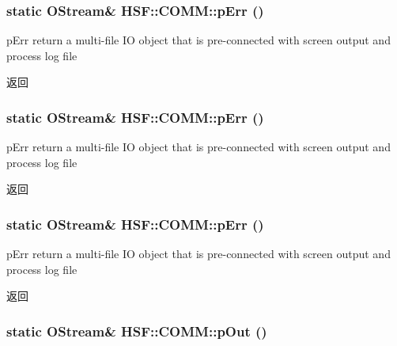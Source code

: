 \label{classHSF_1_1COMM_ad97b577f23c1a1f9f72d8d84b497e2c2}
\hypertarget{classHSF_1_1COMM_ad3b168a9b2f1a465334f5c161d8fb67b}{
\subsubsection[{pErr}]{\setlength{\rightskip}{0pt plus 5cm}static {\bf OStream}\& HSF::COMM::pErr ()}}
\label{classHSF_1_1COMM_ad3b168a9b2f1a465334f5c161d8fb67b}


pErr return a multi-\/file IO object that is pre-\/connected with screen output and process log file \begin{DoxyReturn}{返回}

\end{DoxyReturn}
\hypertarget{classHSF_1_1COMM_ad3b168a9b2f1a465334f5c161d8fb67b}{
\subsubsection[{pErr}]{\setlength{\rightskip}{0pt plus 5cm}static {\bf OStream}\& HSF::COMM::pErr ()}}
\label{classHSF_1_1COMM_ad3b168a9b2f1a465334f5c161d8fb67b}


pErr return a multi-\/file IO object that is pre-\/connected with screen output and process log file \begin{DoxyReturn}{返回}

\end{DoxyReturn}
\hypertarget{classHSF_1_1COMM_ad3b168a9b2f1a465334f5c161d8fb67b}{
\subsubsection[{pErr}]{\setlength{\rightskip}{0pt plus 5cm}static {\bf OStream}\& HSF::COMM::pErr ()}}
\label{classHSF_1_1COMM_ad3b168a9b2f1a465334f5c161d8fb67b}


pErr return a multi-\/file IO object that is pre-\/connected with screen output and process log file \begin{DoxyReturn}{返回}

\end{DoxyReturn}
\hypertarget{classHSF_1_1COMM_a34972039314a2f48f084316f6c2a02bb}{
\subsubsection[{pOut}]{\setlength{\rightskip}{0pt plus 5cm}static {\bf OStream}\& HSF::COMM::pOut ()}}
\label{classHSF_1_1COMM_a34972039314a2f48f084316f6c2a02bb}



